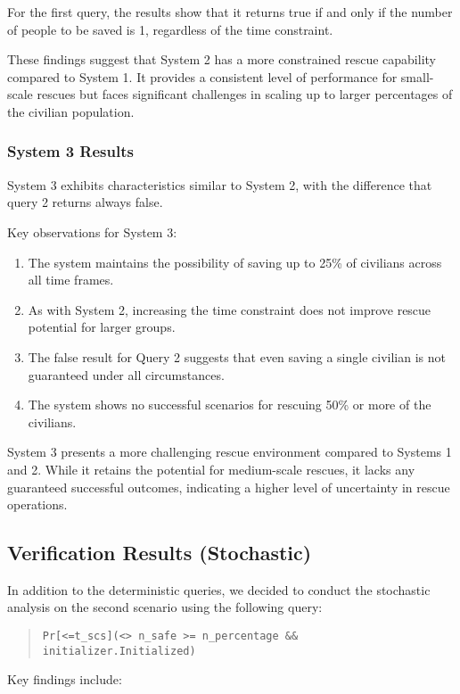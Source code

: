 For the first query, the results show that it returns true if and only if the number of people to be saved is 1, regardless of the time constraint.

These findings suggest that System 2 has a more constrained rescue capability compared to System 1. It provides a consistent level of performance for small-scale rescues but faces significant challenges in scaling up to larger percentages of the civilian population.


\subsubsection{System 3 Results}

System 3 exhibits characteristics similar to System 2, with the difference that query 2 returns always false.

Key observations for System 3:
\begin{enumerate}
	\item The system maintains the possibility of saving up to 25\% of civilians across all time frames.
	\item As with System 2, increasing the time constraint does not improve rescue potential for larger groups.
	\item The false result for Query 2 suggests that even saving a single civilian is not guaranteed under all circumstances.
	\item The system shows no successful scenarios for rescuing 50\% or more of the civilians.
\end{enumerate}

System 3 presents a more challenging rescue environment compared to Systems 1 and 2. While it retains the potential for medium-scale rescues, it lacks any guaranteed successful outcomes, indicating a higher level of uncertainty in rescue operations.

\subsection{Verification Results (Stochastic)}
In addition to the deterministic queries, we decided to conduct the stochastic analysis on the second scenario using the following query:

\begin{quote}
	\texttt{Pr[<=t\_scs](<> n\_safe >= n\_percentage \&\& initializer.Initialized)}
\end{quote}

Key findings include:

